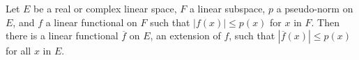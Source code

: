 Let $E$ be a real or complex linear space, $F$ a linear subspace, $p$ a pseudo-norm on $E$, and $f$ a linear functional on $F$ such that $|f(x)| \leq p(x)$ for $x$ in $F$. Then there is a linear functional $\overline{f}$ on $E$, an extension of $f$, such that $|\overline{f}(x)| \leq p(x)$ for all $x$ in $E$.
